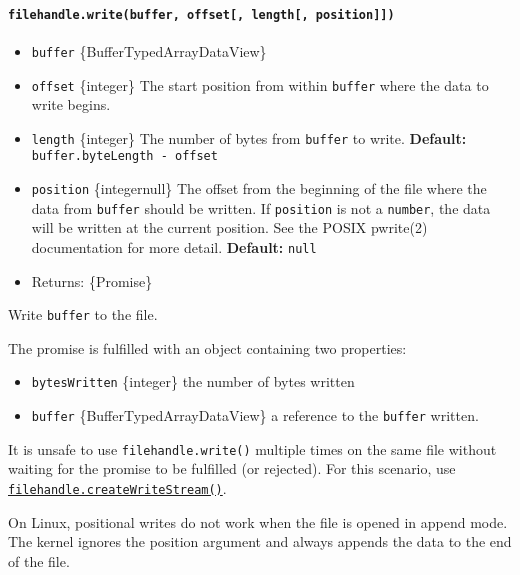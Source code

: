 \paragraph{\texorpdfstring{\texttt{filehandle.write(buffer,\ offset{[},\ length{[},\ position{]}{]})}}{filehandle.write(buffer, offset{[}, length{[}, position{]}{]})}}\label{filehandle.writebuffer-offset-length-position}

\begin{itemize}
\tightlist
\item
  \texttt{buffer} \{Buffer\textbar TypedArray\textbar DataView\}
\item
  \texttt{offset} \{integer\} The start position from within
  \texttt{buffer} where the data to write begins.
\item
  \texttt{length} \{integer\} The number of bytes from \texttt{buffer}
  to write. \textbf{Default:} \texttt{buffer.byteLength\ -\ offset}
\item
  \texttt{position} \{integer\textbar null\} The offset from the
  beginning of the file where the data from \texttt{buffer} should be
  written. If \texttt{position} is not a \texttt{number}, the data will
  be written at the current position. See the POSIX pwrite(2)
  documentation for more detail. \textbf{Default:} \texttt{null}
\item
  Returns: \{Promise\}
\end{itemize}

Write \texttt{buffer} to the file.

The promise is fulfilled with an object containing two properties:

\begin{itemize}
\tightlist
\item
  \texttt{bytesWritten} \{integer\} the number of bytes written
\item
  \texttt{buffer} \{Buffer\textbar TypedArray\textbar DataView\} a
  reference to the \texttt{buffer} written.
\end{itemize}

It is unsafe to use \texttt{filehandle.write()} multiple times on the
same file without waiting for the promise to be fulfilled (or rejected).
For this scenario, use
\hyperref[filehandlecreatewritestreamoptions]{\texttt{filehandle.createWriteStream()}}.

On Linux, positional writes do not work when the file is opened in
append mode. The kernel ignores the position argument and always appends
the data to the end of the file.

